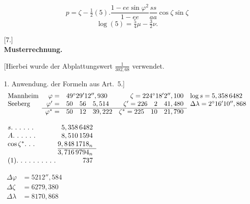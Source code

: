 \clearpage
\noindent\makebox[12mm][l]{}\par\medskip
{}
\[
p=\zeta-\tfrac12(5).\frac{1-ee\sin\varphi^2}{1-ee}\frac{ss}{aa}\cos\zeta\sin\zeta
\]
\[\log(5)=\tfrac54\mu-\tfrac32\nu.\]
\begin{center}[7.]\\[.5ex]\textbf{Musterrechnung.}\end{center}

[Hierbei wurde der Abplattungswert \(\frac1{302,68}\) verwendet.

1. Anwendung. der Formeln aus Art.~5.]
\begingroup\small
\[
\begin{array}{lrlrl}
\text{Mannheim}&\varphi=&49^\circ29'12'',930&\zeta=224^\circ18'2'',100&\log s=5,358\,6482\\
\text{Seeberg}&\varphi'=&50\quad56\quad5,514&\zeta'=226\quad2\quad41,480&\Delta\lambda=2^\circ16'10'',868\\\cline{2-4}
&\varphi^*=&50\quad12\quad39,222&\zeta^*=225\quad10\quad21,790&
\end{array}
\]
\noindent\begin{minipage}[t]{.28\linewidth}\vspace{0pt}\centering
\(\begin{array}{l@{\;}r}
s\ldotp\,\ldotp\,\ldotp\,\ldotp\,\ldotp\,\ldotp&5,358\,6482\\
A\ldotp\,\ldotp\,\ldotp\,\ldotp\,\ldotp\,\ldotp&8,510\,1594\\
\cos\zeta^*\ldotp\,\ldotp\,\ldotp&9,848\,1718_n\\\cline{2-2}
&3,716\,9794_n\\
(1)\ldotp\,\ldotp\,\ldotp\,\ldotp\,\ldotp\,\ldotp\,\ldotp\,\ldotp\,\ldotp\,\ldotp&737
\end{array}\)
\par\vspace{3.7ex}
\(\begin{aligned}
\Delta\varphi&=5212'',584\\
\Delta\zeta&=6279,380\\
\Delta\lambda&=8170,868
\end{aligned}\)
\end{minipage}\hfill
